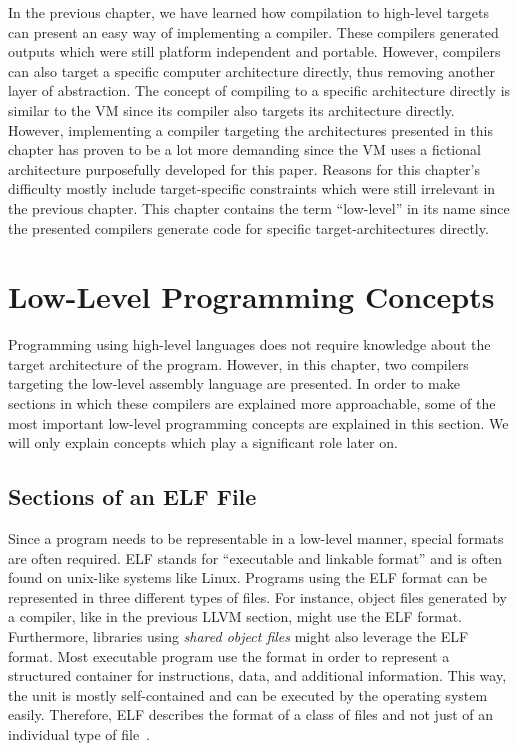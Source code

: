 In the previous chapter, we have learned how compilation to high-level targets can present an easy way of implementing a compiler.
These compilers generated outputs which were still platform independent and portable.
However, compilers can also target a specific computer architecture directly, thus removing another layer of abstraction.
The concept of compiling to a specific architecture directly is similar to the VM since its compiler also targets its architecture directly.
However, implementing a compiler targeting the architectures presented in this chapter has proven to be a lot more demanding since the VM uses a fictional architecture purposefully developed for this paper.
Reasons for this chapter's difficulty mostly include target-specific constraints which were
still irrelevant in the previous chapter.
This chapter contains the term \enquote{low-level} in its name since the presented compilers
generate code for specific target-architectures directly.

\section{Low-Level Programming Concepts}
Programming using high-level languages does not require knowledge about the target architecture of the program.
However, in this chapter, two compilers targeting the low-level assembly language are presented.
In order to make sections in which these compilers are explained more approachable,
some of the most important low-level programming concepts are explained in this section.
We will only explain concepts which play a significant role later on.

\subsection{Sections of an ELF File}
Since a program needs to be representable in a low-level manner, special formats are often required.
ELF stands for \enquote{executable and linkable format} and is often found on unix-like systems like Linux.
Programs using the ELF format can be represented in three different types of files.
For instance, object files generated by a compiler, like in the previous LLVM section, might use the ELF format.
Furthermore, libraries using \emph{shared object files} might also leverage the ELF format.
Most executable program use the format in order to represent a structured container for instructions, data, and additional information.
This way, the unit is mostly self-contained and can be executed by the operating system easily.
Therefore, ELF describes the format of a class of files and not just of an individual type of file~\cite[p.~74-76]{Zhirkov2017-wk}.

